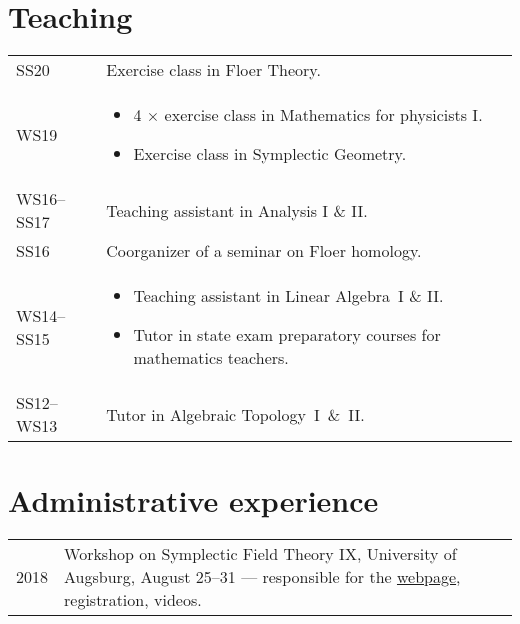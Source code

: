 \documentclass[a4paper,12pt]{article}
\begin{document}
\printbibliography[heading=none,env=midbib] 

\section*{Teaching}

\begingroup
\def\arraystretch{1.5}
\def\minipagewidthT{.837\textwidth}
\begin{tabularx}{\textwidth}{@{}lX@{}}
SS20 & Exercise class in Floer Theory.\\
WS19 & \begin{minipage}[t]{\minipagewidthT} 
\begin{itemize}[leftmargin=*,itemsep=-1ex]
\item 4 $\times$ exercise class in Mathematics for physicists I.
\item Exercise class in Symplectic Geometry.
\end{itemize}
\end{minipage} \\
WS16--SS17 & Teaching assistant in  Analysis I \& II. \\
SS16 & Coorganizer of a seminar on Floer homology. \\
WS14--SS15 & \begin{minipage}[t]{\minipagewidthT} 
\begin{itemize}[leftmargin=*,itemsep=-1ex]
\item Teaching assistant in Linear Algebra~I \& II.
\item Tutor in state exam preparatory courses for mathematics teachers.
\end{itemize}
\end{minipage}\\
SS12--WS13 & Tutor in Algebraic Topology~I~\&~II.	   		   
\end{tabularx}
\endgroup

\section*{Administrative experience}

\begingroup
\def\arraystretch{1.5}
\def\minpagewidthAE{.92\textwidth}
\begin{tabularx}{\textwidth}{@{}lX@{}}
2018 & \begin{minipage}[t]{\minpagewidthAE}
Workshop on Symplectic Field Theory IX, University of Augsburg, August 25--31 --- responsible for the \href{https://www.math.uni-augsburg.de/prof/geo/SFTIX/}{webpage}, registration, videos.
\end{minipage}
\end{tabularx}
\endgroup
\end{document}
